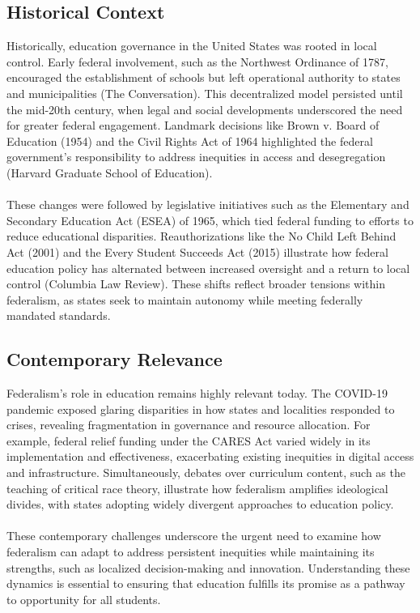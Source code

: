 \documentclass[11pt]{extarticle}
\begin{document}
\subsection{Historical Context}
Historically, education governance in the United States was rooted in local control. Early federal involvement, such as the Northwest Ordinance of 1787, encouraged the establishment of schools but left operational authority to states and municipalities (The Conversation). This decentralized model persisted until the mid-20th century, when legal and social developments underscored the need for greater federal engagement. Landmark decisions like Brown v. Board of Education (1954) and the Civil Rights Act of 1964 highlighted the federal government’s responsibility to address inequities in access and desegregation (Harvard Graduate School of Education).\\
\\
These changes were followed by legislative initiatives such as the Elementary and Secondary Education Act (ESEA) of 1965, which tied federal funding to efforts to reduce educational disparities. Reauthorizations like the No Child Left Behind Act (2001) and the Every Student Succeeds Act (2015) illustrate how federal education policy has alternated between increased oversight and a return to local control (Columbia Law Review). These shifts reflect broader tensions within federalism, as states seek to maintain autonomy while meeting federally mandated standards.
\subsection{Contemporary Relevance}
Federalism’s role in education remains highly relevant today. The COVID-19 pandemic exposed glaring disparities in how states and localities responded to crises, revealing fragmentation in governance and resource allocation. For example, federal relief funding under the CARES Act varied widely in its implementation and effectiveness, exacerbating existing inequities in digital access and infrastructure. Simultaneously, debates over curriculum content, such as the teaching of critical race theory, illustrate how federalism amplifies ideological divides, with states adopting widely divergent approaches to education policy.\\
\\
These contemporary challenges underscore the urgent need to examine how federalism can adapt to address persistent inequities while maintaining its strengths, such as localized decision-making and innovation. Understanding these dynamics is essential to ensuring that education fulfills its promise as a pathway to opportunity for all students.
\end{document}
